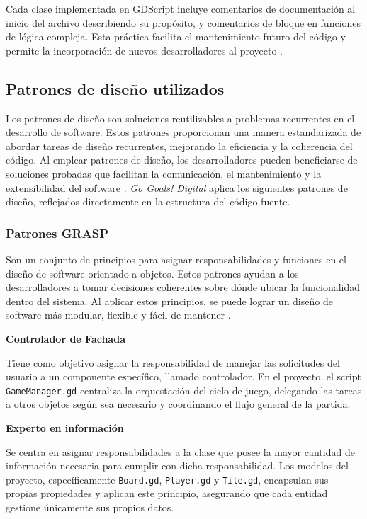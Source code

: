 Cada clase implementada en GDScript incluye comentarios de documentación al inicio del archivo describiendo su propósito, y comentarios de bloque en funciones de lógica compleja. Esta práctica facilita el mantenimiento futuro del código y permite la incorporación de nuevos desarrolladores al proyecto \parencite{GodotDocs2026}.

\subsection{Patrones de diseño utilizados}
\label{subsec:patrones}

Los patrones de diseño son soluciones reutilizables a problemas recurrentes en el desarrollo de software. Estos patrones proporcionan una manera estandarizada de abordar tareas de diseño recurrentes, mejorando la eficiencia y la coherencia del código. Al emplear patrones de diseño, los desarrolladores pueden beneficiarse de soluciones probadas que facilitan la comunicación, el mantenimiento y la extensibilidad del software \parencite{Pressman2019}. \textit{Go Goals! Digital} aplica los siguientes patrones de diseño, reflejados directamente en la estructura del código fuente.

\subsubsection{Patrones GRASP}
\label{subsubsec:patrones_grasp}

Son un conjunto de principios para asignar responsabilidades y funciones en el diseño de software orientado a objetos. Estos patrones ayudan a los desarrolladores a tomar decisiones coherentes sobre dónde ubicar la funcionalidad dentro del sistema. Al aplicar estos principios, se puede lograr un diseño de software más modular, flexible y fácil de mantener \parencite{Pressman2019}.

\textbf{Controlador de Fachada}

Tiene como objetivo asignar la responsabilidad de manejar las solicitudes del usuario a un componente específico, llamado controlador. En el proyecto, el script \texttt{GameManager.gd} centraliza la orquestación del ciclo de juego, delegando las tareas a otros objetos según sea necesario y coordinando el flujo general de la partida.

\textbf{Experto en información}

Se centra en asignar responsabilidades a la clase que posee la mayor cantidad de información necesaria para cumplir con dicha responsabilidad. Los modelos del proyecto, específicamente \texttt{Board.gd}, \texttt{Player.gd} y \texttt{Tile.gd}, encapsulan sus propias propiedades y aplican este principio, asegurando que cada entidad gestione únicamente sus propios datos.

